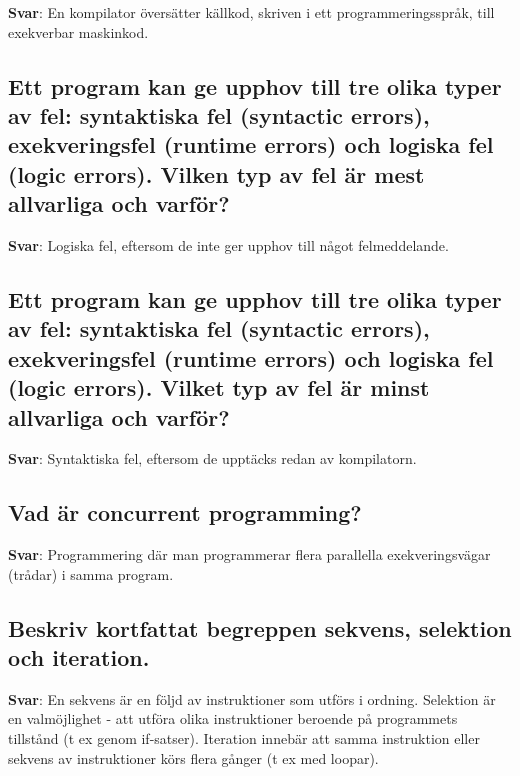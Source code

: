 \documentclass[a4paper,11pt,oneside]{article}
\begin{document}
\begin{sloppypar}
\label{q:201:sa:sv:True}

\textbf{Svar}: En kompilator \"overs\"atter k\"allkod, skriven i ett programmeringsspr\r{a}k, till exekverbar maskinkod.



\subsection{Ett program kan ge upphov till tre olika typer av fel: syntaktiska fel (syntactic errors), exekveringsfel (runtime errors) och logiska fel (logic errors). Vilken typ av fel \"ar mest allvarliga och varf\"or?}

\label{q:202:sa:sv:True}

\textbf{Svar}: Logiska fel, eftersom de inte ger upphov till n\r{a}got felmeddelande.



\subsection{Ett program kan ge upphov till tre olika typer av fel: syntaktiska fel (syntactic errors), exekveringsfel (runtime errors) och logiska fel (logic errors). Vilket typ av fel \"ar minst allvarliga och varf\"or?}

\label{q:203:sa:sv:True}

\textbf{Svar}: Syntaktiska fel, eftersom de uppt\"acks redan av kompilatorn.



\subsection{Vad \"ar concurrent programming?}

\label{q:204:sa:sv:True}

\textbf{Svar}: Programmering d\"ar man programmerar flera parallella exekveringsv\"agar (tr\r{a}dar) i samma program.



\subsection{Beskriv kortfattat begreppen sekvens, selektion och iteration.}

\label{q:205:sa:sv:True}

\textbf{Svar}: En sekvens \"ar en f\"oljd av instruktioner som utf\"ors i ordning. Selektion \"ar en valm\"ojlighet - att utf\"ora olika instruktioner beroende p\r{a} programmets tillst\r{a}nd (t ex genom if-satser). Iteration inneb\"ar att samma instruktion eller sekvens av instruktioner k\"ors flera g\r{a}nger (t ex med loopar).




\end{sloppypar}
\end{document}
